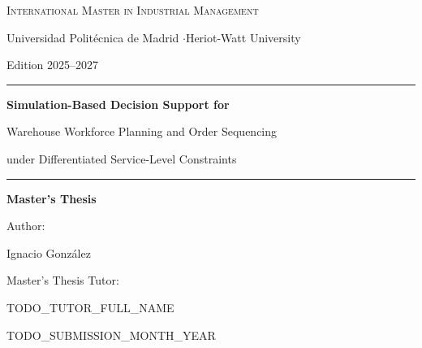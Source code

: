 %
%
\begin{titlepage}
\thispagestyle{empty}
\centering
\vspace*{1.6cm}

{\scshape\large International Master in Industrial Management\par}
\vspace{0.3cm}
{\small Universidad Polit\'ecnica de Madrid \quad$\cdot$\quad Heriot-Watt University\par}
\vspace{0.2cm}
{\small Edition 2025--2027\par}

\vspace{2.2cm}
\rule{\textwidth}{0.6pt}
\vspace{0.7cm}

{\LARGE\bfseries
Simulation-Based Decision Support for

\vspace{0.25em}
Warehouse Workforce Planning and Order Sequencing

\vspace{0.25em}
under Differentiated Service-Level Constraints\par}

\vspace{0.7cm}
\rule{\textwidth}{0.6pt}

\vspace{2.4cm}
{\large\textbf{Master's Thesis}\par}

\vspace{1.6cm}
{\large Author:\par}
\vspace{0.2cm}
{\Large Ignacio Gonz\'alez\par}

\vspace{1.2cm}
{\large Master's Thesis Tutor:\par}
\vspace{0.2cm}
{\Large TODO\_TUTOR\_FULL\_NAME\par}

\vfill
{\large TODO\_SUBMISSION\_MONTH\_YEAR\par}
\vspace{1.2cm}
\end{titlepage}
